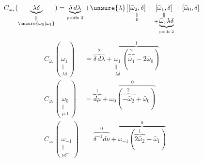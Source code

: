 \[
\begin{aligned}
C_{\bar\omega_*}(\underset{\substack{\Vert\\\unsure{\omega_0|\omega_1}}}{\underbrace{\lambda\delta}})
&=\underbrace{\delta\,d\lambda}_{\text{poids }2}+\unsure{\lambda}
\bigl[\underset{\substack{\Vert\\0}}{[\bar\omega_2,\delta]}
+\underset{\substack{\Vert\\+\underbrace{\bar\omega_1\lambda\delta}_{\text{poids }2}}}{[\bar\omega_1,\delta]}
+[\bar\omega_0,\delta]
\end{aligned}
\]
\margin{$\deleted{\unsure{+|-}}\underbrace{2\bar\omega_0\lambda\delta}$}
\[
\begin{aligned}
C_{\bar\omega_*}(\underset{\substack{\Vert\\\lambda\delta}}{\omega_1})
&=\overbrace{\delta\,d\lambda}^{2}
+\overbrace{\underset{\substack{\Vert\\\lambda\delta}}{\omega_1}
(\overbrace{\bar\omega_1}^{2}-2\bar\omega_0)}^{1}\\
C_{\bar\omega_*}(\underset{\substack{\Vert\\\mu.1}}{\omega_0})
&=\overbrace{d\mu}^{1}
+\overbrace{\omega_0(\overbrace{-\bar\omega_2}^{2}+\bar\omega_0)}^{0}\\
C_{\bar\omega_*}(\underset{\substack{\Vert\\\nu\delta^{-1}}}{\omega_{-1}})
&=\overbrace{\delta^{-1}d\nu}^{0}
+\overbrace{\omega_{-1}(\overbrace{2\bar\omega_2}^{1}-\bar\omega_1)}^{0}
\end{aligned}
\]

